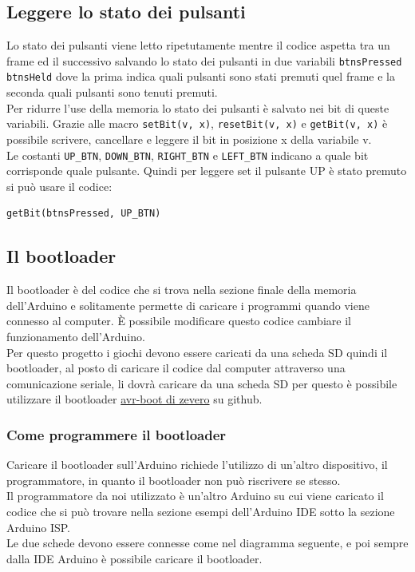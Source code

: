 \documentclass[a4paper,12pt]{article}
\begin{document}
\subsection{Leggere lo stato dei pulsanti}
Lo stato dei pulsanti viene letto ripetutamente mentre il codice aspetta tra un
frame ed il successivo salvando lo stato dei pulsanti in due variabili
\verb|btnsPressed| \verb|btnsHeld| dove la prima indica quali pulsanti sono
stati premuti quel frame e la seconda quali pulsanti sono tenuti premuti.
\\
Per ridurre l'use della memoria lo stato dei pulsanti \`e salvato nei bit di 
queste variabili. Grazie alle macro \verb|setBit(v, x)|, \verb|resetBit(v, x)|
e \verb|getBit(v, x)| \`e possibile scrivere, cancellare e leggere il bit in
posizione x della variabile v.
\\
Le costanti \verb|UP_BTN|, \verb|DOWN_BTN|, \verb|RIGHT_BTN| e \verb|LEFT_BTN|
indicano a quale bit corrisponde quale pulsante. Quindi per leggere set il
pulsante UP \`e stato premuto si pu\`o usare il codice:
\begin{lstlisting}
getBit(btnsPressed, UP_BTN)
\end{lstlisting}

\subsection{Il bootloader}
Il bootloader \`e del codice che si trova nella sezione finale della memoria
dell'Arduino e solitamente permette di caricare i programmi quando viene
connesso al computer. \`E possibile modificare questo codice cambiare il
funzionamento dell'Arduino.
\\
Per questo progetto i giochi devono essere caricati da una scheda SD quindi il
bootloader, al posto di caricare il codice dal computer attraverso una
comunicazione seriale, li dovr\`a caricare da una scheda SD per questo \`e
possibile utilizzare il bootloader \href {https://github.com/zevero/avr_boot}{avr-boot di zevero}
su github.
\subsubsection{Come programmere il bootloader}
Caricare il bootloader sull'Arduino richiede l'utilizzo di un'altro dispositivo,
il programmatore, in quanto il bootloader non pu\`o riscrivere se stesso.
\\
Il programmatore da noi utilizzato \`e un'altro Arduino su cui viene caricato il
codice che si pu\`o trovare nella sezione esempi dell'Arduino IDE sotto la
sezione Arduino ISP.
\\
Le due schede devono essere connesse come nel diagramma seguente, e poi sempre
dalla IDE Arduino \`e possibile caricare il bootloader.
\end{document}
